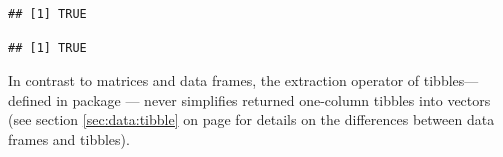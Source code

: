 \documentclass[krantz2]{krantz}\usepackage{knitr}
\begin{document}
\begin{knitrout}
\begin{kframe}
\begin{alltt}
\hlstd{(a.df[ ,} \hlstd{,}  \hlstd{=} \hlstd{])}
\end{alltt}
\begin{verbatim}
## [1] TRUE
\end{verbatim}
\begin{alltt}
\hlstd{(a.df[ ,} \hlstd{,}  \hlstd{=} \hlstd{])}
\end{alltt}
\begin{verbatim}
## [1] TRUE
\end{verbatim}
\end{kframe}
\end{knitrout}

\begin{warningbox}
In contrast to matrices and data frames, the extraction operator \Roperator{[ ]} of tibbles---defined in package --- never simplifies returned one-column tibbles into vectors (see section \ref{sec:data:tibble} on page \pageref{sec:data:tibble} for details on the differences between data frames and tibbles).
\end{warningbox}
\end{document}
